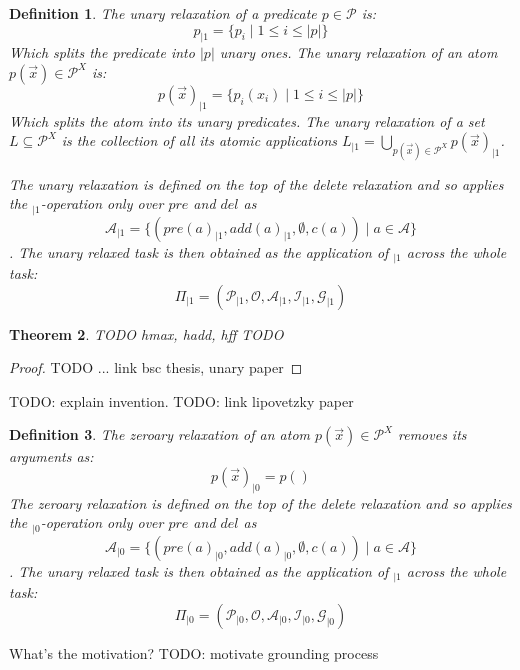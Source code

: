 \documentclass[twocolumn]{article}
\newcommand{\task}{\ensuremath{\Pi}\xspace}
\newcommand{\preds}{\ensuremath{\mathcal{P}}\xspace}
\newcommand{\acts}{\ensuremath{\mathcal{A}}\xspace}
\newcommand{\objects}{\ensuremath{\mathcal{O}}\xspace}
\newcommand{\init}{\ensuremath{\mathcal{I}}\xspace}
\newcommand{\goal}{\ensuremath{\mathcal{G}}\xspace}
\newcommand{\vars}{\ensuremath{X}\xspace}
\newcommand{\someVar}{\ensuremath{x}\xspace}
\newcommand{\atoms}{\ensuremath{\preds^{\vars}}\xspace}
\newcommand{\someAtom}{\ensuremath{p(\vec{\someVar})}\xspace}
\newcommand{\someLiftedSet}{\ensuremath{L}\xspace}
\newcommand{\somePred}{\ensuremath{p}\xspace}
\newcommand{\prename}{\ensuremath{pre}\xspace}
\newcommand{\addname}{\ensuremath{add}\xspace}
\newcommand{\delname}{\ensuremath{del}\xspace}
\newcommand{\pre}[1]{\ensuremath{\prename(#1)}\xspace}
\newcommand{\add}[1]{\ensuremath{\addname(#1)}\xspace}
\newcommand{\arity}[1]{\ensuremath{|#1|}}
\newcommand{\cost}[1]{\ensuremath{c(#1)}\xspace}
\newcommand{\someAct}{\ensuremath{a}\xspace}
\newcommand{\unary}[1]{\ensuremath{#1_{|1}}\xspace}
\newcommand{\zeroary}[1]{\ensuremath{#1_{|0}}\xspace}
\newtheorem{theorem}{Theorem}
\newtheorem{definition}[theorem]{Definition}
\begin{document}
	\begin{definition}
		The unary relaxation of a predicate $\somePred \in \preds$ is:
		$$
		\unary{\somePred} = \{\somePred_i \mid 1 \leq i \leq \arity{\somePred}\}
		$$
		Which splits the predicate into \arity{\somePred} unary ones.
		The unary relaxation of an atom $\someAtom \in \atoms$ is:
		$$
		\unary{\someAtom} =  \{\somePred_i(\someVar_i) \mid 1 \leq i \leq \arity{\somePred}\}
		$$
		Which splits the atom into its unary predicates.
		The unary relaxation of a set $\someLiftedSet \subseteq \atoms$ is the collection of all its atomic applications
		$
		\unary{\someLiftedSet} =  \bigcup_{\someAtom \in \atoms} \unary{\someAtom}
		$.
		
		The unary relaxation is defined on the top of the delete relaxation and so applies the {$\unary{}$}-operation only over \prename and \delname as
		$$
		\unary{\acts} = \{(\unary{\pre{\someAct}}, \unary{\add{\someAct}}, \emptyset, \cost{\someAct}) \mid \someAct \in \acts\}
		$$.
		The unary relaxed task is then obtained as the application of $\unary{}$ across the whole task:
		$$
		\unary{\task} = (\unary{\preds}, \objects, \unary{\acts}, \unary{\init}, \unary{\goal})
		$$
	\end{definition}
	
	\begin{theorem}
		TODO hmax, hadd, hff TODO 
	\end{theorem}
	
	\begin{proof}
		TODO ... link bsc thesis, unary paper
	\end{proof}
	
	
	TODO: explain invention.
	TODO: link lipovetzky paper
	
	\begin{definition}
		The zeroary relaxation of an atom $\someAtom \in \atoms$ removes its arguments as:
		$$
		\zeroary{\someAtom} =  \somePred()
		$$
		The zeroary relaxation is defined on the top of the delete relaxation and so applies the {$\zeroary{}$}-operation only over \prename and \delname as
		$$
		\zeroary{\acts} = \{(\zeroary{\pre{\someAct}}, \zeroary{\add{\someAct}}, \emptyset, \cost{\someAct}) \mid \someAct \in \acts\}
		$$.
		The unary relaxed task is then obtained as the application of $\unary{}$ across the whole task:
		$$
		\zeroary{\task} = (\zeroary{\preds}, \objects, \zeroary{\acts}, \zeroary{\init}, \zeroary{\goal})
		$$
	\end{definition}
	
	What's the motivation?
	TODO: motivate grounding process 
	
\end{document}
